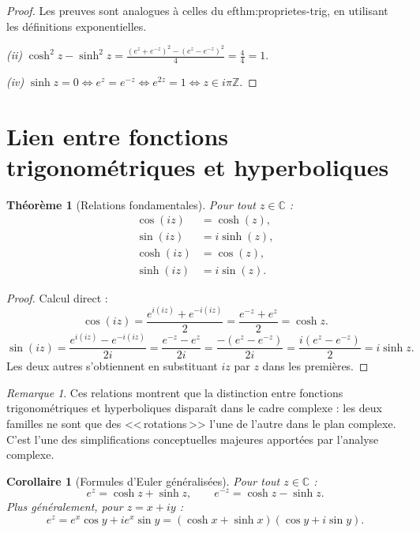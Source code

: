\documentclass[12pt,a4paper,openany]{book}
\theoremstyle{definition}
\theoremstyle{plain}
\newtheorem{theoreme}[definition]{Théorème}
\newtheorem{corollaire}[definition]{Corollaire}
\theoremstyle{remark}
\newtheorem{remarque}[definition]{Remarque}
\newcommand{\C}{\mathbb{C}}
\newcommand{\Z}{\mathbb{Z}}
\begin{document}
\begin{proof}
Les preuves sont analogues à celles du 
ef{thm:proprietes-trig}, en utilisant les définitions exponentielles.

\emph{(ii)} $\cosh^2 z - \sinh^2 z = \frac{(e^z+e^{-z})^2 - (e^z-e^{-z})^2}{4} = \frac{4}{4} = 1$.

\emph{(iv)} $\sinh z = 0 \iff e^z = e^{-z} \iff e^{2z} = 1 \iff z \in i\pi\Z$.
\end{proof}

\section{Lien entre fonctions trigonométriques et hyperboliques}\label{sec:lien-trig-hyp}

\begin{theoreme}[Relations fondamentales]\label{thm:relations-trig-hyp}
Pour tout $z \in \C$ :
\begin{align}
  \cos(iz) &= \cosh(z), \label{eq:cos-iz} \\
  \sin(iz) &= i\sinh(z), \label{eq:sin-iz} \\
  \cosh(iz) &= \cos(z), \label{eq:cosh-iz} \\
  \sinh(iz) &= i\sin(z). \label{eq:sinh-iz}
\end{align}
\end{theoreme}

\begin{proof}
Calcul direct :
\[
  \cos(iz) = \frac{e^{i(iz)} + e^{-i(iz)}}{2} = \frac{e^{-z} + e^{z}}{2} = \cosh z.
\]
\[
  \sin(iz) = \frac{e^{i(iz)} - e^{-i(iz)}}{2i} = \frac{e^{-z} - e^z}{2i}
           = \frac{-(e^z - e^{-z})}{2i} = \frac{i(e^z - e^{-z})}{2} = i\sinh z.
\]
Les deux autres s'obtiennent en substituant $iz$ par $z$ dans les premières.
\end{proof}

\begin{remarque}\label{rem:unification-trig-hyp}
Ces relations montrent que la distinction entre fonctions trigonométriques et
hyperboliques disparaît dans le cadre complexe : les deux familles ne sont que
des <<\,rotations\,>> l'une de l'autre dans le plan complexe. C'est l'une des
simplifications conceptuelles majeures apportées par l'analyse complexe.
\end{remarque}

\begin{corollaire}[Formules d'Euler généralisées]\label{cor:euler-generalisees}
Pour tout $z \in \C$ :
\[
  e^z = \cosh z + \sinh z, \qquad
  e^{-z} = \cosh z - \sinh z.
\]
Plus généralement, pour $z = x + iy$ :
\[
  e^z = e^x\cos y + ie^x\sin y = (\cosh x + \sinh x)(\cos y + i\sin y).
\]
\end{corollaire}
\end{document}
